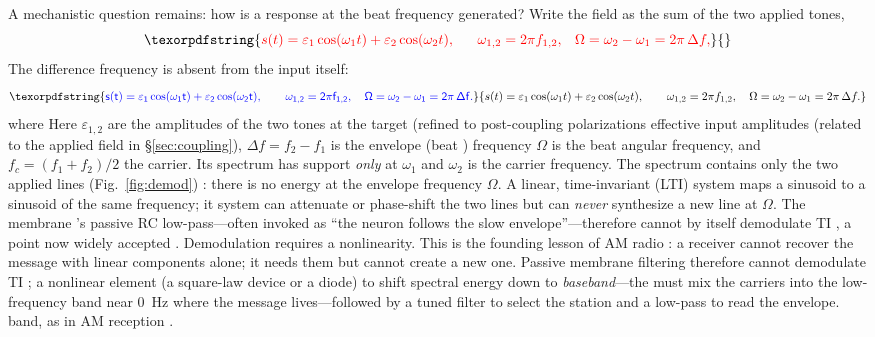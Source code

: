 \documentclass[11pt,a4paper]{article}
\providecommand{\DIFaddtex}[1]{{\protect\color{blue} \sf #1}} %
\providecommand{\DIFdeltex}[1]{{\protect\color{red} \scriptsize #1}} %
\providecommand{\DIFaddbegin}{} %
\providecommand{\DIFaddend}{} %
\providecommand{\DIFdelbegin}{} %
\providecommand{\DIFdelend}{} %
\providecommand{\DIFadd}[1]{\texorpdfstring{\DIFaddtex{#1}}{#1}} %
\providecommand{\DIFdel}[1]{\texorpdfstring{\DIFdeltex{#1}}{}} %
\begin{document}
\DIFdelbegin \DIFdel{A mechanistic question remains: how is a response at the beat frequency generated? Write
the field as the sum of the two applied tones,
}\begin{displaymath}
\DIFdel{s(t)=\varepsilon_1\cos(\omega_1 t)+\varepsilon_2\cos(\omega_2 t),\qquad
\omega_{1,2}=2\pi f_{1,2},\quad \Omega=\omega_2-\omega_1=2\pi\,\Delta f ,
}\end{displaymath}%
\DIFdelend \DIFaddbegin \DIFadd{The difference frequency is absent from the input itself:
}\begin{equation}
\DIFadd{s(t)=\varepsilon_1\cos(\omega_1 t)+\varepsilon_2\cos(\omega_2 t),\qquad
\omega_{1,2}=2\pi f_{1,2},\quad \Omega=\omega_2-\omega_1=2\pi\,\Delta f .
\label{eq:am}
}\end{equation}\DIFaddend
\DIFdelbegin \DIFdel{where }\DIFdelend \DIFaddbegin \DIFadd{Here }\DIFaddend $\varepsilon_{1,2}$ are the \DIFdelbegin \DIFdel{amplitudes of the two tones at the target (refined to post-coupling polarizations }\DIFdelend \DIFaddbegin \DIFadd{effective input amplitudes (related to the applied field
}\DIFaddend in \S\ref{sec:coupling}), \DIFdelbegin \DIFdel{$\Delta f=f_2-f_1$ is the envelope
(beat ) frequency}\DIFdelend \DIFaddbegin \DIFadd{$\Omega$ is the beat angular frequency, }\DIFaddend and
$f_c=(f_1+f_2)/2$ \DIFdelbegin \DIFdel{the carrier. Its spectrum has support \emph{only} at
$\omega_1$ and $\omega_2$ }\DIFdelend \DIFaddbegin \DIFadd{is the carrier frequency. The spectrum contains only the two applied
lines }\DIFaddend (Fig.~\ref{fig:demod})\DIFdelbegin \DIFdel{: there is no energy at the envelope frequency
$\Omega$}\DIFdelend . A linear, time-invariant \DIFdelbegin \DIFdel{(LTI) system maps a sinusoid to a sinusoid of the same
frequency; it }\DIFdelend \DIFaddbegin \DIFadd{system }\DIFaddend can attenuate or phase-shift
\DIFdelbegin \DIFdel{the two lines but can \emph{never} synthesize a new line at $\Omega$. The membrane 's passive RC
low-pass---often invoked as ``the neuron follows the slow envelope''---therefore
cannot
by itself demodulate TI , a point now widely accepted \cite{mirzakhalili2020}.
Demodulation requires a nonlinearity. This is
the founding lesson of AM radio \cite{nahin2001}: a receiver cannot
recover the message with linear components alone; it needs }\DIFdelend \DIFaddbegin \DIFadd{them but cannot create a new one. Passive membrane filtering therefore cannot
demodulate TI \cite{mirzakhalili2020}; }\DIFaddend a nonlinear element \DIFdelbegin \DIFdel{(a
square-law device or a diode) to shift spectral energy down to \emph{baseband}---the
}\DIFdelend \DIFaddbegin \DIFadd{must mix the carriers into
the }\DIFaddend low-frequency \DIFdelbegin \DIFdel{band near $0$~Hz where the message lives---followed by a tuned filter to
select the station and a low-pass to read the envelope.
}\DIFdelend \DIFaddbegin \DIFadd{band, as in AM reception \cite{nahin2001}.
}\DIFaddend
\end{document}
